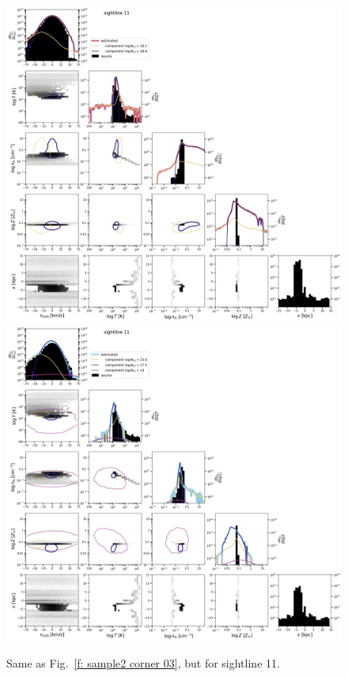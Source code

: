 \documentclass[fleqn,usenatbib]{mnras}
\begin{document}
\begin{figure}
    \centering
    \includegraphics[height=0.45\textheight]{figures/sample2/original/sightline_0011.png}
    \includegraphics[height=0.45\textheight]{figures/sample2/high-z/sightline_0011.png}
    \label{f: sample2 11 corner}
    \caption{Same as Fig.~\ref{f: sample2 corner 03}, but for sightline 11.}
\end{figure}
\end{document}
